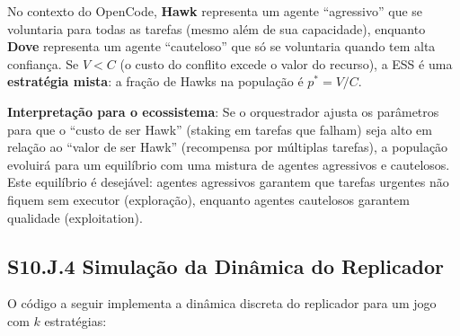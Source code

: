 No contexto do OpenCode, \textbf{Hawk} representa um agente ``agressivo'' que se voluntaria para todas as tarefas (mesmo além de sua capacidade), enquanto \textbf{Dove} representa um agente ``cauteloso'' que só se voluntaria quando tem alta confiança. Se $V < C$ (o custo do conflito excede o valor do recurso), a ESS é uma \textbf{estratégia mista}: a fração de Hawks na população é $p^* = V/C$.

\textbf{Interpretação para o ecossistema}: Se o orquestrador ajusta os parâmetros para que o ``custo de ser Hawk'' (staking em tarefas que falham) seja alto em relação ao ``valor de ser Hawk'' (recompensa por múltiplas tarefas), a população evoluirá para um equilíbrio com uma mistura de agentes agressivos e cautelosos. Este equilíbrio é desejável: agentes agressivos garantem que tarefas urgentes não fiquem sem executor (exploração), enquanto agentes cautelosos garantem qualidade (exploitation).

\subsection*{S10.J.4 Simulação da Dinâmica do Replicador}

O código a seguir implementa a dinâmica discreta do replicador para um jogo com $k$ estratégias:

